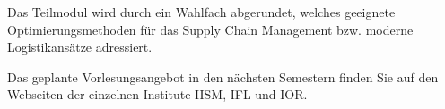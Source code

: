 \begin{module}
\begin{content}
 

Das Teilmodul wird durch ein Wahlfach abgerundet, welches geeignete Optimierungsmethoden für das Supply Chain Management bzw. moderne Logistikansätze adressiert.


\end{content}

\begin{remarks}Das geplante Vorlesungsangebot in den nächsten Semestern finden Sie auf den Webseiten der einzelnen Institute IISM, IFL und IOR.

\end{remarks}

\end{module}

